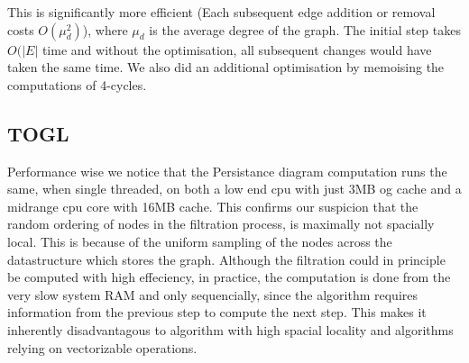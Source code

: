 \documentclass[a4paper,12pt]{article}
\begin{document}
This is significantly more efficient (Each subsequent edge addition or removal costs \(O(\mu_d^2)\)), where \(\mu_d\) is the average degree of the graph. The initial step takes \(O(|E|\) time and without the optimisation, all subsequent changes would have taken the same time.
We also did an additional optimisation by memoising the computations of 4-cycles.

\subsection{TOGL}

Performance wise we notice that the Persistance diagram computation runs the same, when single threaded, on both a low end cpu with just 3MB og cache and a midrange cpu core with 16MB cache. This confirms our suspicion that the random ordering of nodes in the filtration process, is maximally not spacially local. This is because of the uniform sampling of the nodes across the datastructure which stores the graph. Although the filtration could in principle be computed with high effeciency, in practice, the computation is done from the very slow system RAM and only sequencially, since the algorithm requires information from the previous step to compute the next step. This makes it inherently disadvantagous to algorithm with high spacial locality and algorithms relying on vectorizable operations.


\printbibliography
\end{document}
